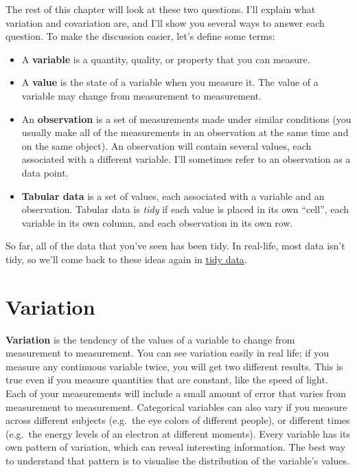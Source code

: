 \documentclass[]{book}
\begin{document}
The rest of this chapter will look at these two questions. I'll explain
what variation and covariation are, and I'll show you several ways to
answer each question. To make the discussion easier, let's define some
terms:

\begin{itemize}
\item
  A \textbf{variable} is a quantity, quality, or property that you can
  measure.
\item
  A \textbf{value} is the state of a variable when you measure it. The
  value of a variable may change from measurement to measurement.
\item
  An \textbf{observation} is a set of measurements made under similar
  conditions (you usually make all of the measurements in an observation
  at the same time and on the same object). An observation will contain
  several values, each associated with a different variable. I'll
  sometimes refer to an observation as a data point.
\item
  \textbf{Tabular data} is a set of values, each associated with a
  variable and an observation. Tabular data is \emph{tidy} if each value
  is placed in its own ``cell'', each variable in its own column, and
  each observation in its own row.
\end{itemize}

So far, all of the data that you've seen has been tidy. In real-life,
most data isn't tidy, so we'll come back to these ideas again in
\protect\hyperlink{tidy-data-1}{tidy data}.

\section{Variation}\label{variation}

\textbf{Variation} is the tendency of the values of a variable to change
from measurement to measurement. You can see variation easily in real
life; if you measure any continuous variable twice, you will get two
different results. This is true even if you measure quantities that are
constant, like the speed of light. Each of your measurements will
include a small amount of error that varies from measurement to
measurement. Categorical variables can also vary if you measure across
different subjects (e.g.~the eye colors of different people), or
different times (e.g.~the energy levels of an electron at different
moments). Every variable has its own pattern of variation, which can
reveal interesting information. The best way to understand that pattern
is to visualise the distribution of the variable's values.
\end{document}
